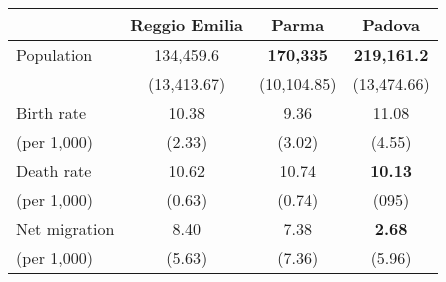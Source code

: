 \begin{tabular}{l c c c}
\toprule
&	Reggio Emilia & Parma & Padova \\
\midrule
Population	& 134,459.6 &   \textbf{170,335} &  \textbf{219,161.2}   \\
			& (13,413.67) & (10,104.85)& (13,474.66)   \\
Birth rate & 		10.38 &9.36  & 	11.08 \\
	\quad(per 1,000)	&		(2.33) & (3.02) & (4.55) \\
Death rate &  10.62 &  10.74 & \textbf{10.13} \\
	\quad(per 1,000)	& (0.63) & (0.74) & (095) \\
Net migration & 8.40 &  7.38 & \textbf{2.68} \\
	\quad(per 1,000)		& (5.63) & (7.36) & (5.96) \\
\bottomrule
\end{tabular}


